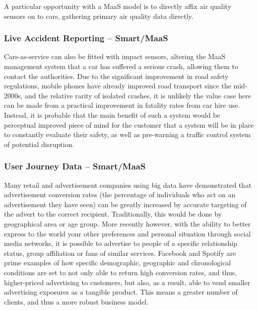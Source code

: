 \documentclass[journal]{IEEEtran}
\begin{document}

A particular opportunity with a MaaS model is to directly affix air
quality sensors on to cars, gathering primary air quality data
directly.


\subsubsection{Live Accident Reporting -- Smart/MaaS}

Cars-as-service can also be fitted with impact sensors, altering the
MaaS management system that a car has suffered a serious crash,
allowing them to contact the authorities. Due to the significant
improvement in road safety regulations, mobile phones have already
improved road transport since the mid-2000s, and the relative rarity
of isolated crashes, it is unlikely the value case here can be made
from a practical improvement in fatality rates from car hire
use. Instead, it is probable that the main benefit of such a system
would be perceptual improved piece of mind for the customer that a
system will be in place to constantly evaluate their safety, as well
as pre-warning a traffic control system of potential disruption.


\subsubsection{User Journey Data – Smart/MaaS}

Many retail and advertisement companies using big data have
demonstrated that advertisement conversion rates (the percentage of
individuals who act on an advertisement they have seen) can be greatly
increased by accurate targeting of the advert to the correct
recipient. Traditionally, this would be done by geographical area or
age group. More recently however, with the ability to better express
to the world your other preferences and personal situation through
social media networks, it is possible to advertise to people of a
specific relationship status, group affiliation or fans of similar
services. Facebook and Spotify are prime examples of how specific
demographic, geographic and chronological conditions are set to not
only able to return high conversion rates, and thus, higher-priced
advertising to customers, but also, as a result, able to vend smaller
advertising exposures as a tangible product. This means a greater
number of clients, and thus a more robust business model.
\end{document}
